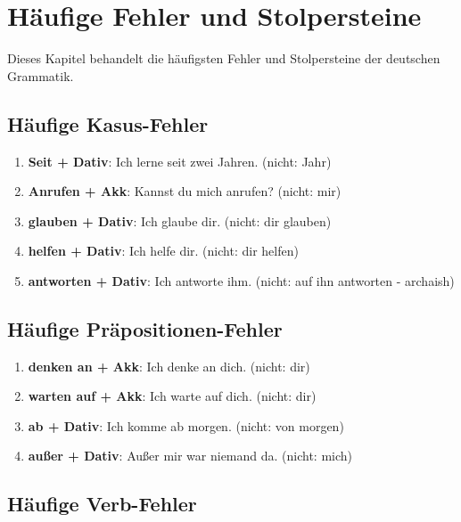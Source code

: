 \chapter{Häufige Fehler und Stolpersteine}
\label{cha:Stolpersteine}

Dieses Kapitel behandelt die häufigsten Fehler und Stolpersteine der deutschen Grammatik.

\section{Häufige Kasus-Fehler}
\label{sec:KasusFehler}

\begin{enumerate}
    \item \textbf{Seit + Dativ}: Ich lerne seit zwei Jahren. (nicht: Jahr)
    \item \textbf{Anrufen + Akk}: Kannst du mich anrufen? (nicht: mir)
    \item \textbf{glauben + Dativ}: Ich glaube dir. (nicht: dir glauben)
    \item \textbf{helfen + Dativ}: Ich helfe dir. (nicht: dir helfen)
    \item \textbf{antworten + Dativ}: Ich antworte ihm. (nicht: auf ihn antworten - archaish)
\end{enumerate}

\section{Häufige Präpositionen-Fehler}
\label{sec:PraepFehler}

\begin{enumerate}
    \item \textbf{denken an + Akk}: Ich denke an dich. (nicht: dir)
    \item \textbf{warten auf + Akk}: Ich warte auf dich. (nicht: dir)
    \item \textbf{ab + Dativ}: Ich komme ab morgen. (nicht: von morgen)
    \item \textbf{außer + Dativ}: Außer mir war niemand da. (nicht: mich)
\end{enumerate}

\section{Häufige Verb-Fehler}
\label{sec:VerbFehler}

